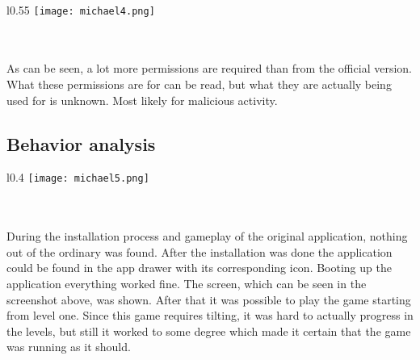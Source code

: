 ~\\
~\\
~\\
~\\
~\\
~\\

\begin{minipage}{\linewidth}
\begin{wrapfigure}{l}{0.55\textwidth}
\centering
\texttt{[image: michael4.png]}
\end{wrapfigure}

~\\
~\\
As can be seen, a lot more permissions are required than from the official version. What these permissions are for can be read, but what they are actually being used for is unknown. Most likely for malicious activity.

\end{minipage}

\newpage
\subsection{Behavior analysis}



\begin{minipage}{\linewidth}
\begin{wrapfigure}{l}{0.4\textwidth}
\centering
\texttt{[image: michael5.png]}
\end{wrapfigure}

~\\
~\\
During the installation process and gameplay of the original application, nothing out of the ordinary was found. After the installation was done the application could be found in the app drawer with its corresponding icon. Booting up the application everything worked fine. The screen, which can be seen in the screenshot above, was shown. After that it was possible to play the game starting from level one. Since this game requires tilting, it was hard to actually progress in the levels, but still it worked to some degree which made it certain that the game was running as it should.

\end{minipage}

